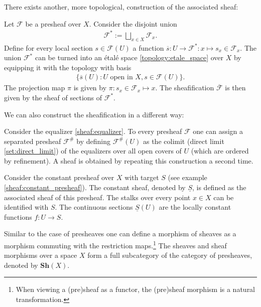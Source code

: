     There exists another, more topological, construction of the associated sheaf:
    \begin{construct}\label{sheaf:etale_construction}
        Let $\mathcal{F}$ be a presheaf over $X$. Consider the disjoint union
        \begin{gather}
            \mathcal{F}^* := \bigsqcup_{x\in X}\mathcal{F}_x.
        \end{gather}
        Define for every local section $s\in\mathcal{F}(U)$ a function $\overline{s}:U\rightarrow\mathcal{F}^*:x\mapsto s_x\in\mathcal{F}_x$. The union $\mathcal{F}^*$ can be turned into an \'etal\'e space \ref{topology:etale_space} over $X$ by equipping it with the topology with basis
        \begin{gather}
            \big\{\overline{s}(U):U\text{ open in }X, s\in\mathcal{F}(U)\big\}.
        \end{gather}
        The projection map $\pi$ is given by $\pi:s_x\in\mathcal{F}_x\mapsto x$. The sheafification $\overline{\mathcal{F}}$ is then given by the sheaf of sections of $\mathcal{F}^*$.
    \end{construct}

    We can also construct the sheafification in a different way:
    \begin{construct}\label{sheaf:colimit_construction}
        Consider the equalizer \ref{sheaf:equalizer}. To every presheaf $\mathcal{F}$ one can assign a separated presheaf $\mathcal{F}^\#$ by defining $\mathcal{F}^\#(U)$ as the colimit (direct limit \ref{set:direct_limit}) of the equalizers over all open covers of $U$ (which are ordered by refinement). A sheaf is obtained by repeating this construction a second time.
    \end{construct}

    \begin{example}\label{sheaf:constant_sheaf}
        Consider the constant presheaf over $X$ with target $S$ (see example \ref{sheaf:constant_presheaf}). The constant sheaf, denoted by $\underline{S}$, is defined as the associated sheaf of this presheaf. The stalks over every point $x\in X$ can be identified with $S$. The continuous sections $\underline{S}(U)$ are the locally constant functions $f:U\rightarrow S$.
    \end{example}

    \begin{notation}
        Similar to the case of presheaves one can define a morphism of sheaves as a morphism commuting with the restriction maps.\footnote{When viewing a (pre)sheaf as a functor, the (pre)sheaf morphism is a natural transformation.} The sheaves and sheaf morphisms over a space $X$ form a full subcategory of the category of presheaves, denoted by $\mathbf{Sh}(X)$.
    \end{notation}

